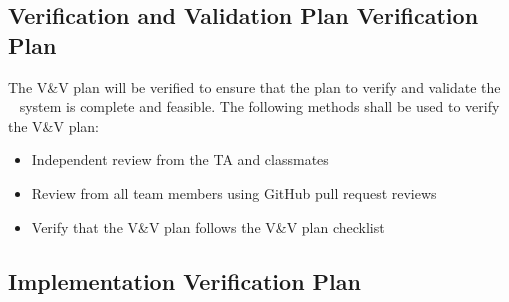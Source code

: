 \documentclass[12pt, titlepage]{article}
\begin{document}
\subsection{Verification and Validation Plan Verification Plan}




The V\&V plan will be verified to ensure that the plan to verify and validate the \progname~ system is complete and feasible. The following methods shall be used to verify the V\&V plan:

\begin{itemize}
  \item Independent review from the TA and classmates
  \item Review from all team members using GitHub pull request reviews
    \item Verify that the V\&V plan follows the V\&V plan checklist \cite{Checklist-VnV}
\end{itemize}

\subsection{Implementation Verification Plan}


  
\end{document}
